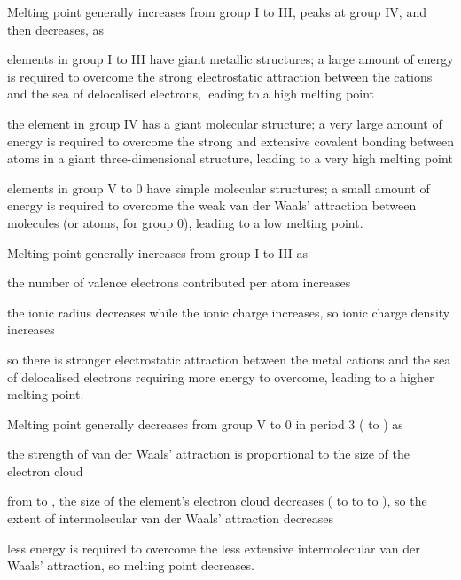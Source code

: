 \documentclass[Chemistry.tex]{subfiles}
\begin{document}
Melting point generally increases from group I to III, peaks at group IV, and then decreases, as \begin{slinenum}
\item elements in group I to III have giant metallic structures; a large amount of energy is required to overcome the strong electrostatic attraction between the cations and the sea of delocalised electrons, leading to a high melting point
\item the element in group IV has a giant molecular structure; a very large amount of energy is required to overcome the strong and extensive covalent bonding between atoms in a giant three-dimensional structure, leading to a very high melting point
\item elements in group V to 0 have simple molecular structures; a small amount of energy is required to overcome the weak van der Waals' attraction between molecules (or atoms, for group 0), leading to a low melting point.
\end{slinenum}

Melting point generally increases from group I to III as \begin{slinenum}
\item the number of valence electrons contributed per atom increases
\item the ionic radius decreases while the ionic charge increases, so ionic charge density increases
\item so there is stronger electrostatic attraction between the metal cations and the sea of delocalised electrons requiring more energy to overcome, leading to a higher melting point.
\end{slinenum}

Melting point generally decreases from group V to 0 in period 3 ( to ) as \begin{slinenum}
\item the strength of van der Waals' attraction is proportional to the size of the electron cloud
\item from  to , the size of the element's electron cloud decreases ( to  to  to ), so the extent of intermolecular van der Waals' attraction decreases
\item less energy is required to overcome the less extensive intermolecular van der Waals' attraction, so melting point decreases.
\end{slinenum}
\end{document}
